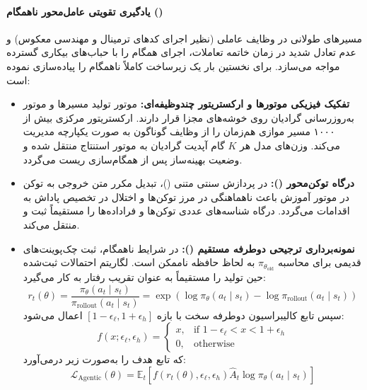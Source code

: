 \paragraph*{یادگیری تقویتی عامل‌محور ناهمگام ()}
مسیرهای طولانی در وظایف عاملی (نظیر اجرای کدهای ترمینال و مهندسی معکوس) و عدم تعادل شدید در زمان خاتمه تعاملات، اجرای همگام  را با حباب‌های بیکاری گسترده مواجه می‌سازد.  برای نخستین بار یک زیرساخت کاملاً ناهمگام را پیاده‌سازی نموده است:
\begin{itemize}
    \item \textbf{تفکیک فیزیکی موتورها و ارکستریتور چندوظیفه‌ای:} موتور تولید مسیرها و موتور به‌روزرسانی گرادیان روی خوشه‌های  مجزا قرار دارند. ارکستریتور مرکزی بیش از ۱۰۰۰ مسیر موازی هم‌زمان را از وظایف گوناگون به صورت یکپارچه مدیریت می‌کند. وزن‌های مدل هر $K$ گام آپدیت گرادیان به موتور استنتاج منتقل شده و وضعیت بهینه‌ساز پس از همگام‌سازی ریست می‌گردد.
    \item \textbf{درگاه توکن‌محور ():} در پردازش سنتی متنی ()، تبدیل مکرر متن خروجی به توکن در موتور آموزش باعث ناهماهنگی در مرز توکن‌ها و اختلال در تخصیص پاداش به اقدامات می‌گردد. درگاه  شناسه‌های عددی توکن‌ها و فراداده‌ها را مستقیماً ثبت و منتقل می‌کند.
    \item \textbf{نمونه‌برداری ترجیحی دوطرفه مستقیم ():} در شرایط ناهمگام، ثبت چک‌پوینت‌های قدیمی برای محاسبه $\pi_{\theta_{\text{old}}}$ به لحاظ حافظه ناممکن است.  لگاریتم احتمالات ثبت‌شده حین تولید را مستقیماً به عنوان تقریب رفتار به کار می‌گیرد:
    \begin{equation}
        r_t(\theta) = \frac{\pi_\theta(a_t \mid s_t)}{\pi_{\text{rollout}}(a_t \mid s_t)} = \exp\left( \log \pi_\theta(a_t \mid s_t) - \log \pi_{\text{rollout}}(a_t \mid s_t) \right)
    \end{equation}
    سپس تابع کالیبراسیون دوطرفه سخت با بازه $[1-\epsilon_\ell, 1+\epsilon_h]$ اعمال می‌شود:
    \begin{equation}
        f(x; \epsilon_\ell, \epsilon_h) = \begin{cases} 
        x, & \text{if } 1 - \epsilon_\ell < x < 1 + \epsilon_h \\ 
        0, & \text{otherwise} 
        \end{cases}
    \end{equation}
    که تابع هدف را به‌صورت زیر درمی‌آورد:
    \begin{equation}
        \mathcal{L}_{\text{Agentic}}(\theta) = \mathbb{E}_t \left[ f(r_t(\theta), \epsilon_\ell, \epsilon_h) \hat{A}_t \log \pi_\theta(a_t \mid s_t) \right]

\end{equation}
\end{itemize}
